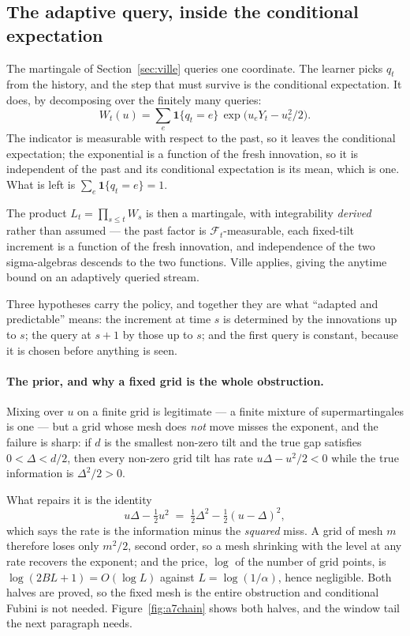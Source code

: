 \subsection{The adaptive query, inside the conditional expectation}
\label{sec:adaptive}

The martingale of Section~\ref{sec:ville} queries one coordinate. The learner picks $q_{t}$
from the history, and the step that must survive is the conditional expectation. It does,
by decomposing over the finitely many queries:
\[
W_{t}(u)=\sum_{e}\mathbf{1}\{q_{t}=e\}\,
\exp\!\bigl(u_{e}Y_{t}-u_{e}^{2}/2\bigr).
\]
The indicator is measurable with respect to the past, so it leaves the conditional
expectation; the exponential is a function of the fresh innovation, so it is independent of
the past and its conditional expectation is its mean, which is one. What is left is
$\sum_{e}\mathbf{1}\{q_{t}=e\}=1$.

The product $L_{t}=\prod_{s\le t}W_{s}$ is then a martingale, with integrability
\emph{derived} rather than assumed --- the past factor is $\mathcal{F}_{t}$-measurable, each
fixed-tilt increment is a function of the fresh innovation, and independence of the two
sigma-algebras descends to the two functions. Ville applies, giving the anytime bound on an
adaptively queried stream.

Three hypotheses carry the policy, and together they are what ``adapted and predictable''
means: the increment at time $s$ is determined by the innovations up to $s$; the query at
$s+1$ by those up to $s$; and the first query is constant, because it is chosen before
anything is seen.


\paragraph{The prior, and why a fixed grid is the whole obstruction.}
Mixing over $u$ on a finite grid is legitimate --- a finite mixture of supermartingales is
one --- but a grid whose mesh does \emph{not} move misses the exponent, and the failure is
sharp: if $d$ is the smallest non-zero tilt and the true gap satisfies $0<\Delta<d/2$, then
every non-zero grid tilt has rate $u\Delta-u^{2}/2<0$ while the true information is
$\Delta^{2}/2>0$.

What repairs it is the identity
\[
u\Delta-\tfrac{1}{2}u^{2}\;=\;\tfrac{1}{2}\Delta^{2}-\tfrac{1}{2}(u-\Delta)^{2},
\]
which says the rate is the information minus the \emph{squared} miss. A grid of mesh $m$
therefore loses only $m^{2}/2$, second order, so a mesh shrinking with the level at any
rate recovers the exponent; and the price, $\log$ of the number of grid points, is
$\log(2BL+1)=O(\log L)$ against $L=\log(1/\alpha)$, hence negligible. Both halves are
proved, so the fixed mesh is the entire obstruction and conditional Fubini is not needed.
Figure~\ref{fig:a7chain} shows both halves, and the window tail the next paragraph
needs. \NUM{}

